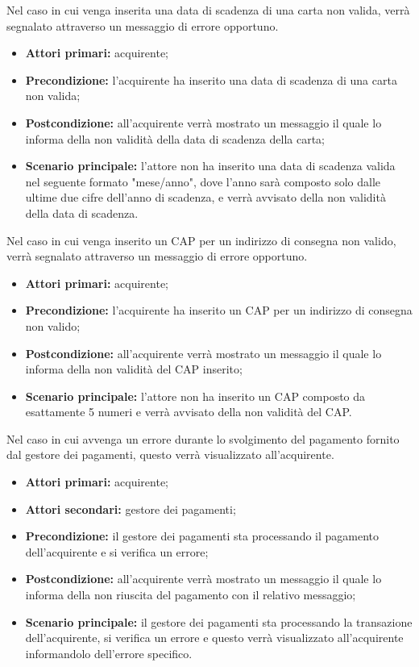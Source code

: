 Nel caso in cui venga inserita una data di scadenza di una carta non valida, verrà segnalato attraverso un messaggio di errore opportuno.
\begin{itemize}
	\item \textbf{Attori primari:} acquirente;
	\item \textbf{Precondizione:} l'acquirente ha inserito una data di scadenza di una carta non valida;
	\item \textbf{Postcondizione:} all'acquirente verrà mostrato un messaggio il quale lo informa della non validità della data di scadenza della carta;
	\item \textbf{Scenario principale:} l'attore non ha inserito una data di scadenza valida nel seguente formato "mese/anno", dove l'anno sarà composto solo dalle ultime due cifre dell'anno di scadenza, e verrà avvisato della non validità della data di scadenza.
\end{itemize}

Nel caso in cui venga inserito un CAP per un indirizzo di consegna non valido, verrà segnalato attraverso un messaggio di errore opportuno.
\begin{itemize}
	\item \textbf{Attori primari:} acquirente;
	\item \textbf{Precondizione:} l'acquirente ha inserito un CAP per un indirizzo di consegna non valido;
	\item \textbf{Postcondizione:} all'acquirente verrà mostrato un messaggio il quale lo informa della non validità del CAP inserito;
	\item \textbf{Scenario principale:} l'attore non ha inserito un CAP composto da esattamente 5 numeri e verrà avvisato della non validità del CAP.
\end{itemize}

Nel caso in cui avvenga un errore durante lo svolgimento del pagamento fornito dal gestore dei pagamenti, questo verrà visualizzato all'acquirente.
\begin{itemize}
	\item \textbf{Attori primari:} acquirente;
	\item \textbf{Attori secondari:} gestore dei pagamenti;
	\item \textbf{Precondizione:} il gestore dei pagamenti sta processando il pagamento dell'acquirente e si verifica un errore;
	\item \textbf{Postcondizione:} all'acquirente verrà mostrato un messaggio il quale lo informa della non riuscita del pagamento con il relativo messaggio;
	\item \textbf{Scenario principale:} il gestore dei pagamenti sta processando la transazione dell'acquirente, si verifica un errore e questo verrà visualizzato all'acquirente informandolo dell'errore specifico.
\end{itemize}